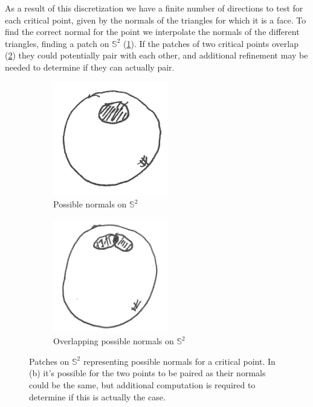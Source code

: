 \documentclass{article}
\begin{document}
As a result of this discretization we have a finite number of directions to test for each critical point, given by
the normals of the triangles for which it is a face. To find the correct normal
for the point we interpolate the normals of the different triangles, finding a patch on
$\mathbb{S}^2$ (\cref{fig:normals-patch}). If the patches of two critical points overlap
(\cref{fig:normals-patch-intersection})
they could potentially pair with each other, and additional refinement may be needed
to determine if they can actually pair.

\begin{figure}
	\centering
	\begin{subfigure}{0.45\columnwidth}
		\centering
		\includegraphics[height=5cm]{fig/normals-patch}
		\caption{\label{fig:normals-patch}Possible normals on $\mathbb{S}^2$}
	\end{subfigure}
	\begin{subfigure}{0.45\columnwidth}
		\centering
		\includegraphics[height=5cm]{fig/normals-patch-intersect}
		\caption{\label{fig:normals-patch-intersection}Overlapping possible normals on $\mathbb{S}^2$}
	\end{subfigure}
	\caption{\label{fig:normals-distrib} Patches on $\mathbb{S}^2$ representing possible
		normals for a critical point. In (b) it's possible for the two points to be paired
		as their normals could be the same, but additional computation is required to
		determine if this is actually the case.}
\end{figure}
\end{document}
